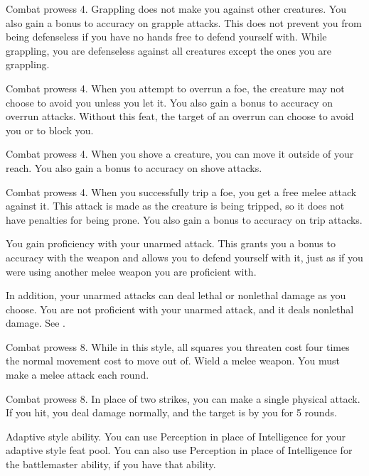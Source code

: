 \featpre Combat prowess 4.
\featben Grappling does not make you  against other creatures.
You also gain a  bonus to accuracy on grapple attacks.
This does not prevent you from being defenseless if you have no hands free to defend yourself with.
While grappling, you are defenseless against all creatures except the ones you are grappling.

\featpre Combat prowess 4.
\featben When you attempt to overrun a foe, the creature may not choose to avoid you unless you let it.
You also gain a  bonus to accuracy on overrun attacks.
Without this feat, the target of an overrun can choose to avoid you or to block you.

\featpre Combat prowess 4.
\featben When you shove a creature, you can move it outside of your reach.
You also gain a  bonus to accuracy on shove attacks.

\featpre Combat prowess 4.
\featben When you successfully trip a foe, you get a free melee attack against it.
This attack is made as the creature is being tripped, so it does not have penalties for being prone.
You also gain a  bonus to accuracy on trip attacks.

\featben You gain proficiency with your unarmed attack.
This grants you a  bonus to accuracy with the weapon and allows you to defend yourself with it, just as if you were using another melee weapon you are proficient with.

In addition, your unarmed attacks can deal lethal or nonlethal damage as you choose.
 You are not proficient with your unarmed attack, and it deals nonlethal damage. See .

\featpre Combat prowess 8.
\featben While in this style, all squares you threaten cost four times the normal movement cost to move out of.
\stylereq Wield a melee weapon.
You must make a melee attack each round.

\featpre Combat prowess 8.
\featben In place of two strikes, you can make a single physical attack.
If you hit, you deal damage normally, and the target is \taunted by you for 5 rounds.

\featpre Adaptive style ability.
\featben You can use Perception in place of Intelligence for your adaptive style feat pool.
You can also use Perception in place of Intelligence for the battlemaster ability, if you have that ability.


